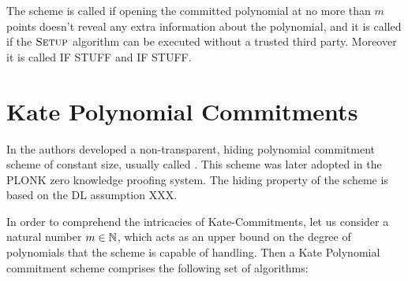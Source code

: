 The scheme is called  if opening the committed polynomial at no more than $m$ points doesn't reveal any extra information about the polynomial, and it is called  if the $\textsc{Setup}$ algorithm can be executed without a trusted third party. Moreover it is called  IF STUFF and  IF STUFF.

\section{Kate Polynomial Commitments}

In \cite{kate-10} the authors developed a non-transparent, hiding polynomial commitment scheme of constant size, usually called . This scheme was later adopted in the PLONK zero knowledge proofing system. The hiding property of the scheme is based on the DL assumption XXX.

In order to comprehend the intricacies of Kate-Commitments, let us consider a natural number $m\in\mathbb{N}$, which acts as an upper bound on the degree of polynomials that the scheme is capable of handling. Then a Kate Polynomial commitment scheme comprises the following set of algorithms:

